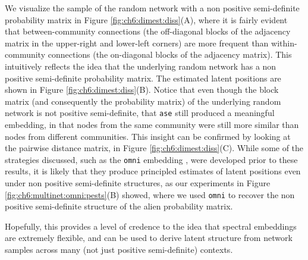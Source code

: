 We visualize the sample of the random network with a non positive semi-definite probability matrix in Figure \ref{fig:ch6:dimest:diss}(A), where it is fairly evident that between-community connections (the off-diagonal blocks of the adjacency matrix in the upper-right and lower-left corners) are more frequent than within-community connections (the on-diagonal blocks of the adjacency matrix). This intuitively reflects the idea that the underlying random network has a non positive semi-definite probability matrix. The estimated latent positions are shown in Figure \ref{fig:ch6:dimest:diss}(B). Notice that even though the block matrix (and consequently the probability matrix) of the underlying random network is not positive semi-definite, that \texttt{ase} still produced a meaningful embedding, in that nodes from the same community were still more similar than nodes from different communities. This insight can be confirmed by looking at the pairwise distance matrix, in Figure \ref{fig:ch6:dimest:diss}(C). While some of the strategies discussed, such as the \texttt{omni} embedding \cite{Levin2017}, were developed prior to these results, it is likely that they produce principled estimates of latent positions even under non positive semi-definite structures, as our experiments in Figure \ref{fig:ch6:multinet:omni:pests}(B) showed, where we used \texttt{omni} to recover the non positive semi-definite structure of the alien probability matrix.

Hopefully, this provides a level of credence to the idea that spectral embeddings are extremely flexible, and can be used to derive latent structure from network samples across many (not just positive semi-definite) contexts.

\newpage
